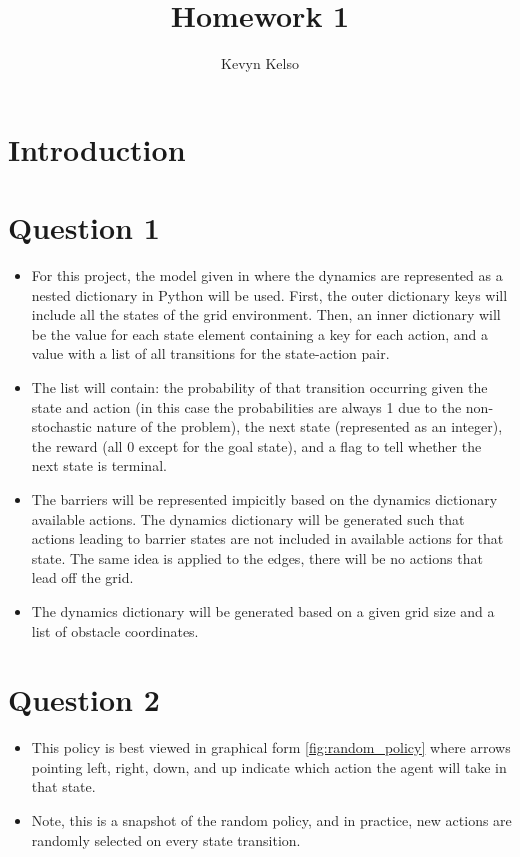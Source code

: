 \documentclass[letterpaper]{article} %
\title{Homework 1}
\author{
    Kevyn Kelso
}
\begin{document}
\maketitle

\begin{abstract}
\end{abstract}

\section{Introduction}

\section{Question 1}
	\begin{itemize}
	    \item For this project, the model given in \cite{Morales2020GrokkingDL} where the dynamics are represented as a nested dictionary in Python will be used. First, the outer dictionary keys will include all the states of the grid environment. Then, an inner dictionary will be the value for each state element containing a key for each action, and a value with a list of all transitions for the state-action pair.
	    \item The list will contain: the probability of that transition occurring given the state and action (in this case the probabilities are always 1 due to the non-stochastic nature of the problem), the next state (represented as an integer), the reward (all 0 except for the goal state), and a flag to tell whether the next state is terminal.
	    \item The barriers will be represented impicitly based on the dynamics dictionary available actions. The dynamics dictionary will be generated such that actions leading to barrier states are not included in available actions for that state. The same idea is applied to the edges, there will be no actions that lead off the grid.
	    \item The dynamics dictionary will be generated based on a given grid size and a list of obstacle coordinates.
	\end{itemize}

\section{Question 2}
	\begin{itemize}
	    \item This policy is best viewed in graphical form \ref{fig:random_policy} where arrows pointing left, right, down, and up indicate which action the agent will take in that state.
	    \item Note, this is a snapshot of the random policy, and in practice, new actions are randomly selected on every state transition.
	\end{itemize}
\end{document}
